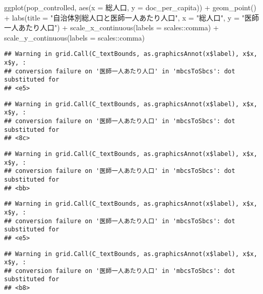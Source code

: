 \documentclass[
]{article}
\newenvironment{Shaded}{\begin{snugshade}}{\end{snugshade}}
\newcommand{\AttributeTok}[1]{\textcolor[rgb]{0.77,0.63,0.00}{#1}}
\newcommand{\FunctionTok}[1]{\textcolor[rgb]{0.00,0.00,0.00}{#1}}
\newcommand{\NormalTok}[1]{#1}
\newcommand{\SpecialCharTok}[1]{\textcolor[rgb]{0.00,0.00,0.00}{#1}}
\newcommand{\StringTok}[1]{\textcolor[rgb]{0.31,0.60,0.02}{#1}}
\begin{document}
\begin{Shaded}
\begin{Highlighting}[]
\FunctionTok{ggplot}\NormalTok{(pop\_controlled, }\FunctionTok{aes}\NormalTok{(}\AttributeTok{x =}\NormalTok{ 総人口, }\AttributeTok{y =}\NormalTok{ doc\_per\_capita)) }\SpecialCharTok{+} \FunctionTok{geom\_point}\NormalTok{() }\SpecialCharTok{+} 
  \FunctionTok{labs}\NormalTok{(}\AttributeTok{title =} \StringTok{"自治体別総人口と医師一人あたり人口"}\NormalTok{, }\AttributeTok{x =} \StringTok{"総人口"}\NormalTok{, }\AttributeTok{y =} \StringTok{"医師一人あたり人口"}\NormalTok{) }\SpecialCharTok{+}
  \FunctionTok{scale\_x\_continuous}\NormalTok{(}\AttributeTok{labels =}\NormalTok{ scales}\SpecialCharTok{::}\NormalTok{comma) }\SpecialCharTok{+}
  \FunctionTok{scale\_y\_continuous}\NormalTok{(}\AttributeTok{labels =}\NormalTok{ scales}\SpecialCharTok{::}\NormalTok{comma)}
\end{Highlighting}
\end{Shaded}

\begin{verbatim}
## Warning in grid.Call(C_textBounds, as.graphicsAnnot(x$label), x$x, x$y, :
## conversion failure on '医師一人あたり人口' in 'mbcsToSbcs': dot substituted for
## <e5>
\end{verbatim}

\begin{verbatim}
## Warning in grid.Call(C_textBounds, as.graphicsAnnot(x$label), x$x, x$y, :
## conversion failure on '医師一人あたり人口' in 'mbcsToSbcs': dot substituted for
## <8c>
\end{verbatim}

\begin{verbatim}
## Warning in grid.Call(C_textBounds, as.graphicsAnnot(x$label), x$x, x$y, :
## conversion failure on '医師一人あたり人口' in 'mbcsToSbcs': dot substituted for
## <bb>
\end{verbatim}

\begin{verbatim}
## Warning in grid.Call(C_textBounds, as.graphicsAnnot(x$label), x$x, x$y, :
## conversion failure on '医師一人あたり人口' in 'mbcsToSbcs': dot substituted for
## <e5>
\end{verbatim}

\begin{verbatim}
## Warning in grid.Call(C_textBounds, as.graphicsAnnot(x$label), x$x, x$y, :
## conversion failure on '医師一人あたり人口' in 'mbcsToSbcs': dot substituted for
## <b8>
\end{verbatim}
\end{document}
